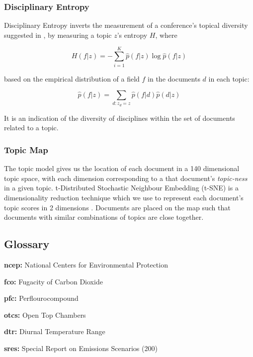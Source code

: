 \documentclass{article}
\begin{document}
\begin{linenumbers}
		
		\subsubsection*{Disciplinary Entropy}
		
		Disciplinary Entropy inverts the measurement of a conference's topical diversity suggested in \cite{Hall2008}, by measuring a topic \(z\)'s entropy \(H\), where 
		
		\begin{equation}
		H(f|z) = -\sum_{i=1}^K \hat{p}(f|z) \log \hat{p}(f|z) 
		\end{equation}
		
		based on the empirical distribution of a field \(f\) in the documents \(d\) in each topic:
		
		\begin{equation}
		\hat{p}(f|z) = \sum_{d:z_d=z} \hat{p} (f|d) \hat{p} (d|z)
		\end{equation}
		
		It is an indication of the diversity of disciplines within the set of documents related to a topic. 
		
		\subsubsection*{Topic Map}
		The topic model gives us the location of each document in a 140 dimensional topic space, with each dimension corresponding to a that document's \textit{topic-ness} in a given topic. t-Distributed Stochastic Neighbour Embedding (t-SNE) is a dimensionality reduction technique which we use to represent each document's topic scores in 2 dimensions \cite{vandermaaten2008}. Documents are placed on the map such that documents with similar combinations of topics are close together.
		
		
		\subsection*{Glossary}
		
		
		\noindent\textbf{ncep:} National Centers for Environmental Protection
		
		\noindent\textbf{fco:} Fugacity of Carbon Dioxide
		
		\noindent\textbf{pfc:} Perflourocompound
		
		\noindent\textbf{otcs:} Open Top Chambers
		
		\noindent\textbf{dtr:} Diurnal Temperature Range
		
		\noindent\textbf{sres:} Special Report on Emissions Scenarios (200)
		

\end{linenumbers}
\end{document}
